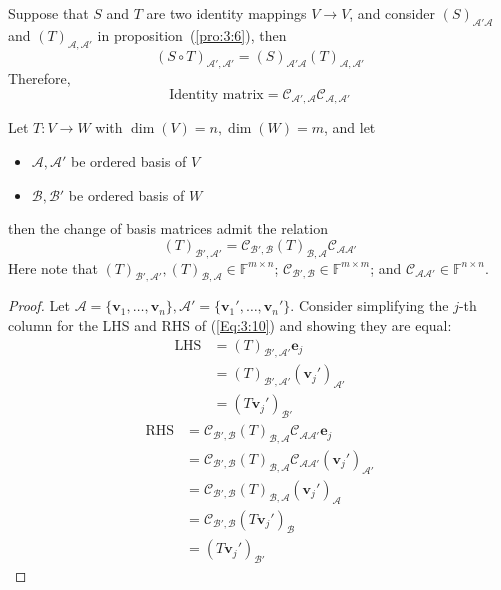 \begin{corollary}

Suppose that $S$ and $T$ are two identity mappings $V\to V$, and consider $(S)_{\mathcal{A}'\mathcal{A}}$ and $(T)_{\mathcal{A},\mathcal{A}'}$ in proposition~(\ref{pro:3:6}), then
\[
(S\circ T)_{\mathcal{A}',\mathcal{A}'}
=(S)_{\mathcal{A}'\mathcal{A}}
(T)_{\mathcal{A},\mathcal{A}'}
\]
Therefore,
\[
\text{Identity matrix}
=
\mathcal{C}_{\mathcal{A}',\mathcal{A}}
\mathcal{C}_{\mathcal{A},\mathcal{A}'}
\]
\end{corollary}

\begin{proposition}
Let $T:V\to W$ with $\dim(V)=n,\dim(W)=m$, and let
\begin{itemize}
\item
$\mathcal{A},\mathcal{A}'$ be ordered basis of $V$
\item
$\mathcal{B},\mathcal{B}'$ be ordered basis of $W$
\end{itemize}
then the change of basis matrices admit the relation
\begin{equation}\label{Eq:3:10}
(T)_{\mathcal{B}',\mathcal{A}'}
=
\mathcal{C}_{\mathcal{B}',\mathcal{B}}
(T)_{\mathcal{B},\mathcal{A}}
\mathcal{C}_{\mathcal{A}\mathcal{A}'}
\end{equation}
Here note that $(T)_{\mathcal{B}',\mathcal{A}'},(T)_{\mathcal{B},\mathcal{A}}\in\mathbb{F}^{m\times n}$; $\mathcal{C}_{\mathcal{B}',\mathcal{B}}\in\mathbb{F}^{m\times m}$; and $\mathcal{C}_{\mathcal{A}\mathcal{A}'}\in\mathbb{F}^{n\times n}$.
\end{proposition}

\begin{proof}
Let $\mathcal{A}=\{\bm v_1,\dots,\bm v_n\},\mathcal{A}'=\{\bm v_1',\dots,\bm v_n'\}$. Consider simplifying the $j$-th column for the LHS and RHS of (\ref{Eq:3:10}) and showing they are equal:
\begin{align*}
\text{LHS}&=(T)_{\mathcal{B}',\mathcal{A}'}\bm e_j\\
&=(T)_{\mathcal{B}',\mathcal{A}'}(\bm v_j')_{\mathcal{A}'}\\
&=(T\bm v_j')_{\mathcal{B}'}
\end{align*}
\begin{align*}
\text{RHS}&=\mathcal{C}_{\mathcal{B}',\mathcal{B}}
(T)_{\mathcal{B},\mathcal{A}}
\mathcal{C}_{\mathcal{A}\mathcal{A}'}\bm e_j\\
&=\mathcal{C}_{\mathcal{B}',\mathcal{B}}
(T)_{\mathcal{B},\mathcal{A}}
\mathcal{C}_{\mathcal{A}\mathcal{A}'}(\bm v_j')_{\mathcal{A}'}\\
&=\mathcal{C}_{\mathcal{B}',\mathcal{B}}
(T)_{\mathcal{B},\mathcal{A}}
(\bm v_j')_{\mathcal{A}}\\
&=\mathcal{C}_{\mathcal{B}',\mathcal{B}}
(T\bm v_j')_{\mathcal{B}}\\
&=(T\bm v_j')_{\mathcal{B}'}
\end{align*}
\end{proof}

